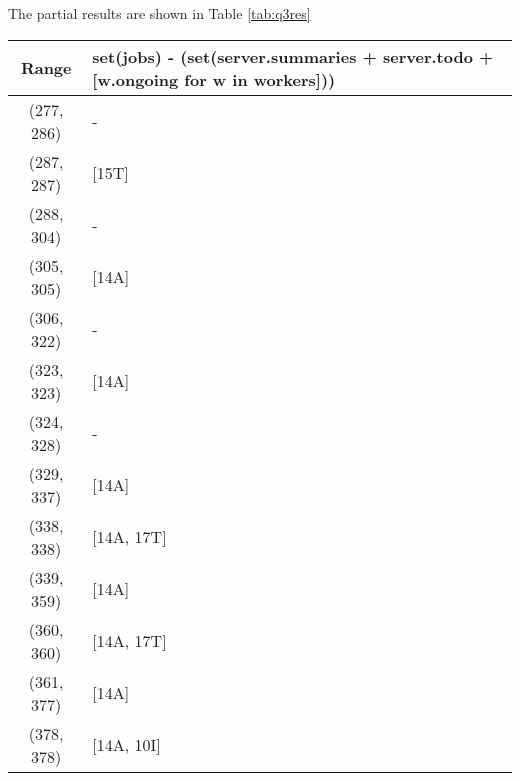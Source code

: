 \documentclass[sigconf,review]{acmart}
\begin{document}
    The partial results are shown in Table \ref{tab:q3res}

    \begin{table}[h]
        \centering
        \begin{tabular}{|c|p{5cm}|}
            \hline
            \textbf{Range} & \textbf{set(jobs) - (set(server.summaries + server.todo + [w.ongoing for w in workers]))} \\ \hline
            (277, 286)     & -                                                                                         \\ \hline
            (287, 287)     & [15T]                                                                                     \\ \hline
            (288, 304)     & -                                                                                         \\ \hline
            (305, 305)     & [14A]                                                                                     \\ \hline
            (306, 322)     & -                                                                                         \\ \hline
            (323, 323)     & [14A]                                                                                     \\ \hline
            (324, 328)     & -                                                                                         \\ \hline
            (329, 337)     & [14A]                                                                                     \\ \hline
            (338, 338)     & [14A, 17T]                                                                                \\ \hline
            (339, 359)     & [14A]                                                                                     \\ \hline
            (360, 360)     & [14A, 17T]                                                                                \\ \hline
            (361, 377)     & [14A]                                                                                     \\ \hline
            (378, 378)     & [14A, 10I]                                                                                \\ \hline

\end{tabular}
\end{table}
\end{document}
